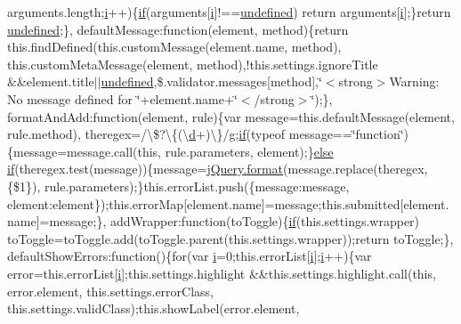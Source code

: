 \begin{DoxyCompactItemize}
arguments.\+length;\hyperlink{_scripts_2respond_8min_8js_a5e25b1d1bed9ab5f3174b76d6a722180}{i}++)\{\hyperlink{_scripts_2respond_8min_8js_a93851d60dd037a83509a1757b9ee7b66}{if}(arguments\mbox{[}\hyperlink{_scripts_2respond_8min_8js_a5e25b1d1bed9ab5f3174b76d6a722180}{i}\mbox{]}!==\hyperlink{_scripts_2jquery-1_810_82_8js_a08113a236cc18d2a9d5ce27e638012be}{undefined}) return arguments\mbox{[}\hyperlink{_scripts_2respond_8min_8js_a5e25b1d1bed9ab5f3174b76d6a722180}{i}\mbox{]};\}return \hyperlink{_scripts_2jquery-1_810_82_8js_a08113a236cc18d2a9d5ce27e638012be}{undefined};\}, default\+Message\+:function(element, method)\{return this.\+find\+Defined(this.\+custom\+Message(element.\+name, method), this.\+custom\+Meta\+Message(element, method),!this.\+settings.\+ignore\+Title \&\&element.\+title$\vert$$\vert$\hyperlink{_scripts_2jquery-1_810_82_8js_a08113a236cc18d2a9d5ce27e638012be}{undefined},\$.validator.\+messages\mbox{[}method\mbox{]},\char`\"{}$<$strong$>$Warning\+: No message defined for \char`\"{}+element.\+name+\char`\"{}$<$/strong$>$\char`\"{});\}, format\+And\+Add\+:function(element, rule)\{var message=this.\+default\+Message(element, rule.\+method), theregex=/\textbackslash{}\$?\textbackslash{}\{(\textbackslash{}\hyperlink{_scripts_2respond_8min_8js_aeb337d295abaddb5ec3cb34cc2e2bbc9}{d}+)\textbackslash{}\}/\hyperlink{_scripts_2respond_8min_8js_a103df269476e78897c9c4c6cb8f4eb06}{g};\hyperlink{_scripts_2respond_8min_8js_a93851d60dd037a83509a1757b9ee7b66}{if}(typeof message==\char`\"{}function\char`\"{})\{message=message.\+call(this, rule.\+parameters, element);\}\hyperlink{_scripts_2jquery_8validate_8js_a0544c3fe466e421738dae463968b70ba}{else} \hyperlink{_scripts_2respond_8min_8js_a93851d60dd037a83509a1757b9ee7b66}{if}(theregex.\+test(message))\{message=\hyperlink{_scripts_2jquery_8validate_8js_a387137c43ed9616d39ba90e890d181eb}{j\+Query.\+format}(message.\+replace(theregex, \textquotesingle{}\{\$1\}\textquotesingle{}), rule.\+parameters);\}this.\+error\+List.\+push(\{message\+:message, element\+:element\});this.\+error\+Map\mbox{[}element.\+name\mbox{]}=message;this.\+submitted\mbox{[}element.\+name\mbox{]}=message;\}, add\+Wrapper\+:function(to\+Toggle)\{\hyperlink{_scripts_2respond_8min_8js_a93851d60dd037a83509a1757b9ee7b66}{if}(this.\+settings.\+wrapper) to\+Toggle=to\+Toggle.\+add(to\+Toggle.\+parent(this.\+settings.\+wrapper));return to\+Toggle;\}, default\+Show\+Errors\+:function()\{for(var \hyperlink{_scripts_2respond_8min_8js_a5e25b1d1bed9ab5f3174b76d6a722180}{i}=0;this.\+error\+List\mbox{[}\hyperlink{_scripts_2respond_8min_8js_a5e25b1d1bed9ab5f3174b76d6a722180}{i}\mbox{]};\hyperlink{_scripts_2respond_8min_8js_a5e25b1d1bed9ab5f3174b76d6a722180}{i}++)\{var error=this.\+error\+List\mbox{[}\hyperlink{_scripts_2respond_8min_8js_a5e25b1d1bed9ab5f3174b76d6a722180}{i}\mbox{]};this.\+settings.\+highlight \&\&this.\+settings.\+highlight.\+call(this, error.\+element, this.\+settings.\+error\+Class, this.\+settings.\+valid\+Class);this.\+show\+Label(error.\+element, 
\end{DoxyCompactItemize}
